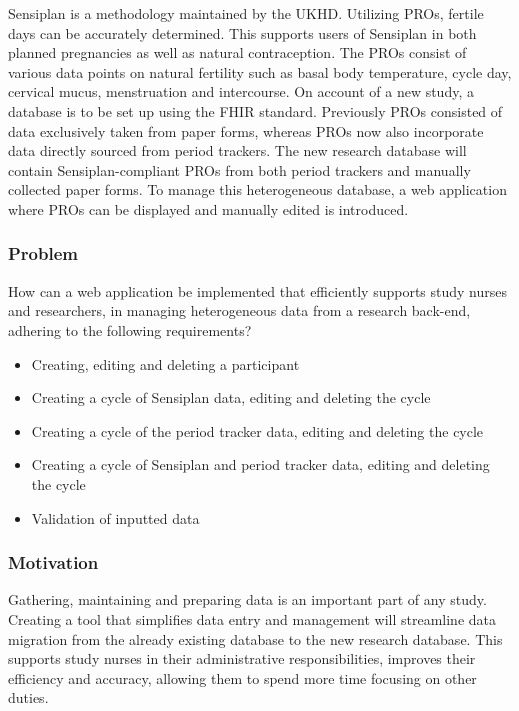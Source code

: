 \documentclass[
a4paper,
11pt
]{article}
\begin{document}
	Sensiplan\textsuperscript{\textcopyright} is a methodology maintained by the \ac{UKHD}. Utilizing \acp{PRO}, fertile days can be accurately determined. This supports users of Sensiplan\textsuperscript{\textcopyright} in both planned pregnancies as well as natural contraception. The \acp{PRO} consist of various data points on natural fertility such as basal body temperature, cycle day, cervical mucus, menstruation and intercourse. On account of a new study, a database is to be set up using the \ac{FHIR} standard. Previously \acp{PRO} consisted of data exclusively taken from paper forms, whereas \acp{PRO} now also incorporate data directly sourced from period trackers. The new research database will contain Sensiplan\textsuperscript{\textcopyright}-compliant \acp{PRO} from both period trackers and manually collected paper forms. To manage this heterogeneous database, a web application where \acp{PRO} can be displayed and manually edited is introduced.
	
	\subsubsection{Problem}
	How can a web application be implemented that efficiently supports study nurses and researchers, in managing heterogeneous data from a research back-end, adhering to the following requirements?
	\begin{itemize}
		\item Creating, editing and deleting a participant
		\item Creating a cycle of Sensiplan\textsuperscript{\textcopyright} data, editing and deleting the cycle
		\item Creating a cycle of the period tracker data, editing and deleting the cycle
		\item Creating a cycle of Sensiplan\textsuperscript{\textcopyright} and period tracker data, editing and deleting the cycle
		\item Validation of inputted data
	\end{itemize}
	
	\subsubsection{Motivation}
	
	Gathering, maintaining and preparing data is an important part of any study. Creating a tool that simplifies data entry and management will streamline data migration from the already existing database to the new research database. This supports study nurses in their administrative responsibilities, improves their efficiency and accuracy, allowing them to spend more time focusing on other duties.
	
\end{document}
